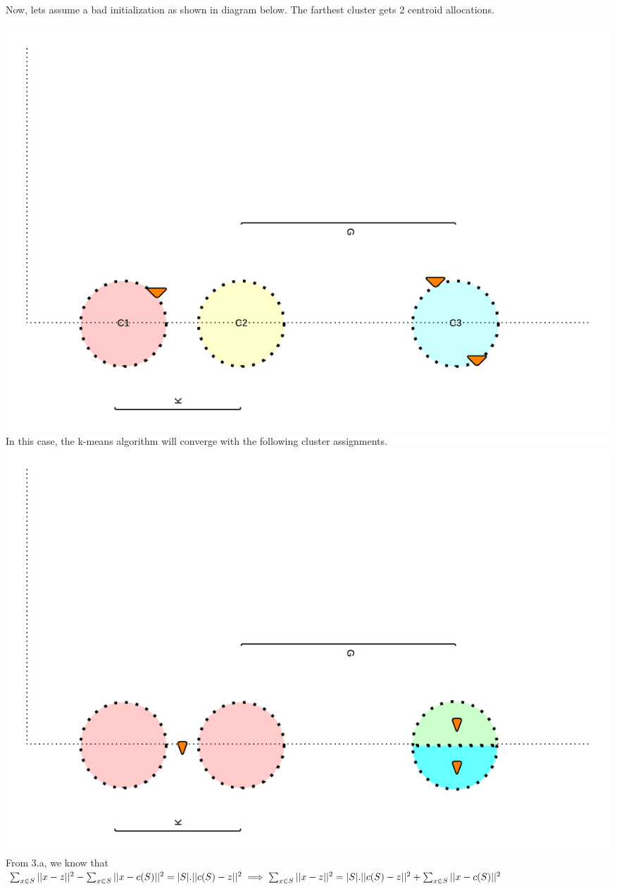 \documentclass[11pt]{article}
\begin{document}
{Now, lets assume a bad initialization as shown in diagram below. The farthest cluster gets 2 centroid allocations.

\includegraphics[scale=0.8]{q3_2} \\

In this case, the k-means algorithm will converge with the following cluster assignments.\\
\includegraphics[scale=0.8]{q3_3} \\

From 3.a, we know that \\

$
\sum_{x \in S} || x - z ||^2 - \sum_{x \in S} || x - c(S)||^2 = |S| . || c(S) - z ||^2 \\ \\
\implies \sum_{x \in S} || x - z ||^2 = |S| . || c(S) - z ||^2 + \sum_{x \in S} || x - c(S)||^2
$ \\

}
\end{document}

